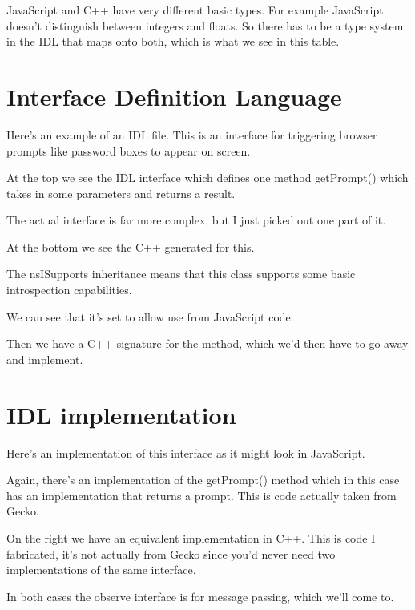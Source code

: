 \documentclass{article}
\begin{document}
JavaScript and C++ have very different basic types. For example JavaScript doesn't distinguish between integers and floats. So there has to be a type system in the IDL that maps onto both, which is what we see in this table.


\section{Interface Definition Language}

Here's an example of an IDL file. This is an interface for triggering browser prompts like password boxes to appear on screen.

At the top we see the IDL interface which defines one method {\code getPrompt()} which takes in some parameters and returns a result.

The actual interface is far more complex, but I just picked out one part of it.

At the bottom we see the C++ generated for this.

The {\code nsISupports} inheritance means that this class supports some basic introspection capabilities.

We can see that it's set to allow use from JavaScript code.

Then we have a C++ signature for the method, which we'd then have to go away and implement.


\section{IDL implementation}

Here's an implementation of this interface as it might look in JavaScript.

Again, there's an implementation of the {\code getPrompt()} method which in this case has an implementation that returns a prompt. This is code actually taken from Gecko.

On the right we have an equivalent implementation in C++. This is code I fabricated, it's not actually from Gecko since you'd never need two implementations of the same interface.

In both cases the {\code observe} interface is for message passing, which we'll come to.

\end{document}
